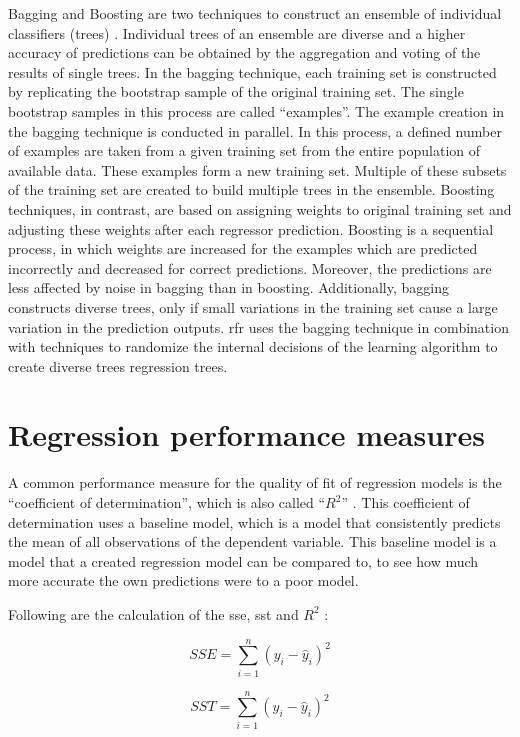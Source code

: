 \documentclass[a4paper, 11pt, oneside]{Thesis}  %
\begin{document}
Bagging and Boosting are two techniques to construct an ensemble of individual classifiers (trees) \cite{Dietterich.2000}. Individual trees of an ensemble are diverse and a higher accuracy of predictions can be obtained by the aggregation and voting of the results of single trees. In the bagging technique, each training set is constructed by replicating the bootstrap sample of the original training set. The single bootstrap samples in this process are called “examples”. The example creation in the bagging technique is conducted in parallel. In this process, a defined number of examples are taken from a given training set from the entire population of available data. These examples form a new training set. Multiple of these subsets of the training set are created to build multiple trees in the ensemble. Boosting techniques, in contrast, are based on assigning weights to original training set and adjusting these weights after each regressor prediction. Boosting is a sequential process, in which weights are increased for the examples which are predicted incorrectly and decreased for correct predictions. Moreover, the predictions are less affected by noise in bagging than in boosting. Additionally, bagging constructs diverse trees, only if small variations in the training set cause a large variation in the prediction outputs. \ac{rfr} uses the bagging technique in combination with techniques to randomize the internal decisions of the learning algorithm to create diverse trees regression trees.


\section{Regression performance measures}
\label{sec:Regression performance measures}

A common performance measure for the quality of fit of regression models is the ``coefficient of determination'', which is also called ``$R^2$'' \cite{Devasthali.2018}. This coefficient of determination uses a baseline model, which is a model that consistently predicts the mean of all observations of the dependent variable. This baseline model is a model that a created regression model can be compared to, to see how much more accurate the own predictions were to a poor model.

Following are the calculation of the \ac{sse}, \ac{sst} and $R^2$ \cite{Devasthali.2018}:

\[SSE = \sum\limits_{i=1}^n (y_{i} - \hat{y}_{i})^2\]

\[SST = \sum\limits_{i=1}^n (y_{i} - \hat{y}_{i})^2\]
\end{document}
